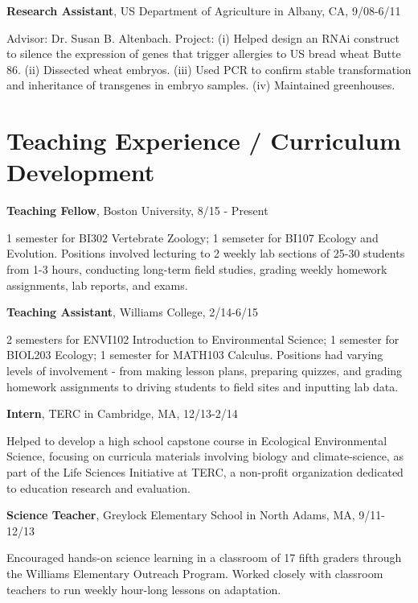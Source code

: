 \documentclass[margin,line]{res}
\begin{document}
\begin{resume}
\vspace{-.1cm}
{\bf Research Assistant},  US Department of Agriculture in Albany, CA, 9/08-6/11

\vspace{-.43cm}
{Advisor: Dr. Susan B. Altenbach. Project: (i) Helped design an RNAi construct to silence the expression of genes that trigger allergies to US bread wheat Butte 86. (ii) Dissected wheat embryos. (iii) Used PCR to confirm stable transformation and inheritance of transgenes in embryo samples. (iv) Maintained greenhouses.}

\section{\sc Teaching Experience / Curriculum Development}
{\bf Teaching Fellow},  Boston University, 8/15 - Present 

\vspace{-.43cm}
{1 semester for BI302 Vertebrate Zoology; 1 semseter for BI107 Ecology and Evolution. Positions involved lecturing to 2 weekly lab sections of 25-30 students from 1-3 hours, conducting long-term field studies, grading weekly homework assignments, lab reports, and exams. }

\vspace{-.1cm}
{\bf Teaching Assistant},  Williams College, 2/14-6/15 

\vspace{-.43cm}
{2 semesters for ENVI102 Introduction to Environmental Science; 1 semester for BIOL203 Ecology; 1 semester for MATH103 Calculus. Positions had varying levels of involvement - from making lesson plans, preparing quizzes, and grading homework assignments to driving students to field sites and inputting lab data.}

\vspace{-.1cm}
{\bf Intern},  TERC in Cambridge, MA, 12/13-2/14

\vspace{-.43cm}
{Helped to develop a high school capstone course in Ecological Environmental Science, focusing on curricula materials involving biology and climate-science, as part of the Life Sciences Initiative at TERC, a non-profit organization dedicated to education research and evaluation. }

\vspace{-.1cm}
{\bf Science Teacher},  Greylock Elementary School in North Adams, MA, 9/11-12/13

\vspace{-.43cm}
{Encouraged hands-on science learning in a classroom of 17 fifth graders through the Williams Elementary Outreach Program. Worked closely with classroom teachers to run weekly hour-long lessons on adaptation. }


\end{resume}
\end{document}
